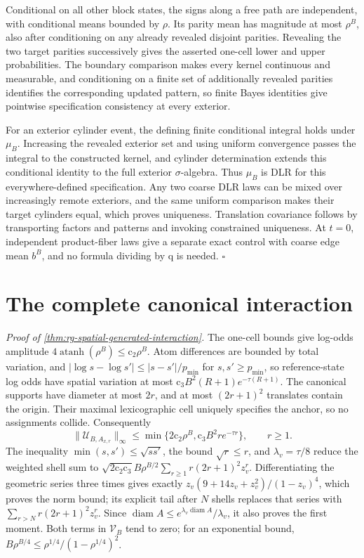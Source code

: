 Conditional on all other block states, the signs along a free path are
independent, with conditional means bounded by \(\rho\). Its parity mean
has magnitude at most \(\rho^B\), also after conditioning on any already
revealed disjoint parities. Revealing the two target parities successively
gives the asserted one-cell lower and upper probabilities. The boundary
comparison makes every kernel continuous and measurable, and conditioning
on a finite set of additionally revealed parities identifies the
corresponding updated pattern, so finite Bayes identities give pointwise
specification consistency at every exterior.

For an exterior cylinder event, the defining finite conditional integral
holds under \(\mu_B\). Increasing the revealed exterior set and using
uniform convergence passes the integral to the constructed kernel, and
cylinder determination extends this conditional identity to the full
exterior \(\sigma\)-algebra. Thus \(\mu_B\) is DLR for this
everywhere-defined specification. Any two coarse DLR laws can be mixed over
increasingly remote exteriors, and the same uniform comparison makes their
target cylinders equal, which proves uniqueness. Translation covariance
follows by transporting factors and patterns and invoking constrained
uniqueness. At \(t=0\), independent product-fiber laws give a separate
exact control with coarse edge mean \(b^B\), and no formula dividing by
\(\mathrm q\) is needed. \hfill\(\square\)

\section{The complete canonical interaction}
\label{sec:rg-spatial-proof-potential}

\noindent\emph{Proof of \cref{thm:rg-spatial-generated-interaction}.}
The one-cell bounds give log-odds amplitude
\(4\operatorname{atanh}(\rho^B)\le\mathrm c_2\rho^B\). Atom differences are
bounded by total variation, and \(|\log s-\log s'|\le|s-s'|/p_{\min}\) for
\(s,s'\ge p_{\min}\), so reference-state log odds have spatial variation at
most \(\mathrm c_3B^2(R+1)e^{-\tau(R+1)}\). The canonical supports have
diameter at most \(2r\), and at most \((2r+1)^2\) translates contain the
origin. Their maximal lexicographic cell uniquely specifies the anchor, so
no assignments collide. Consequently
\begin{equation}
 \|\mathscr U_{B,A_{x,r}}\|_\infty
 \le\min\{2\mathrm c_2\rho^B,\mathrm c_3B^2re^{-\tau r}\},\qquad r\ge1.
 \label{eq:rg-spatial-proof-shell-minimum}
\end{equation}
The inequality \(\min(s,s')\le\sqrt{ss'}\), the bound \(\sqrt r\le r\), and
\(\lambda_v=\tau/8\) reduce the weighted shell sum to
\(\sqrt{2\mathrm c_2\mathrm c_3}B\rho^{B/2}\sum_{r\ge1}r(2r+1)^2z_v^r\).
Differentiating the geometric series three times gives exactly
\(z_v(9+14z_v+z_v^2)/(1-z_v)^4\), which proves the norm bound; its explicit
tail after \(N\) shells replaces that series with
\(\sum_{r>N}r(2r+1)^2z_v^r\). Since
\(\operatorname{diam}A\le e^{\lambda_v\operatorname{diam}A}/\lambda_v\), it
also proves the first moment. Both terms in \(\mathcal V_B\) tend to zero;
for an exponential bound, \(B\rho^{B/4}\le\rho^{1/4}/(1-\rho^{1/4})^2\).

